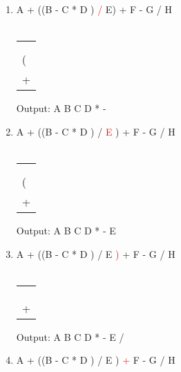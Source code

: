\documentclass[a4paper]{article}
\begin{document}
\begin{large}
\begin{enumerate}
          \newpage
    \item
          A + ((B - C * D ) \textcolor{red}{/}  E) + F - G / H\\
          \\
          \begin{tabular}[t]{ | p{1em} | }
            \makecell{}  \\ \hline
            \makecell{}  \\ \hline
            \makecell{/} \\ \hline
            (            \\ \hline
            +            \\ \hline
          \end{tabular}
          \hspace{2em}
          Output: A B C D * -
    \item
          A + ((B - C * D ) / \textcolor{red}{E} ) + F - G / H\\
          \\
          \begin{tabular}[t]{ | p{1em} | }
            \makecell{}  \\ \hline
            \makecell{}  \\ \hline
            \makecell{/} \\ \hline
            (            \\ \hline
            +            \\ \hline
          \end{tabular}
          \hspace{2em}
          Output: A B C D * - E
    \item
          A + ((B - C * D ) / E \textcolor{red}{)} + F - G / H\\
          \\
          \begin{tabular}[t]{ | p{1em} | }
            \makecell{} \\ \hline
            \makecell{} \\ \hline
            \makecell{} \\ \hline
            \\ \hline
            +           \\ \hline
          \end{tabular}
          \hspace{2em}
          Output: A B C D * - E /
    \item
          A + ((B - C * D ) / E ) \textcolor{red}{+}  F - G / H\\

\end{enumerate}
\end{large}
\end{document}
